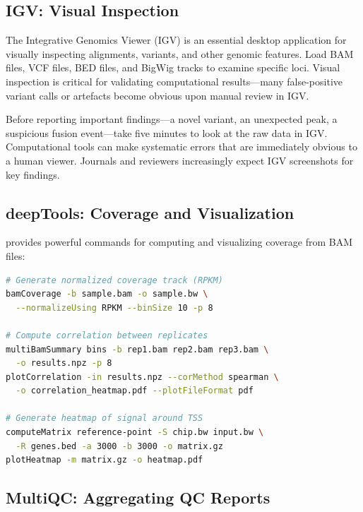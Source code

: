 \subsection{IGV: Visual Inspection}
\label{subsec:bioinf:igv}

The Integrative Genomics Viewer (IGV) is an essential desktop application for visually inspecting alignments, variants, and other genomic features. Load BAM files, VCF files, BED files, and BigWig tracks to examine specific loci. Visual inspection is critical for validating computational results---many false-positive variant calls or artefacts become obvious upon manual review in IGV.

\begin{tipbox}[title={Always Inspect Key Results in IGV}]
Before reporting important findings---a novel variant, an unexpected peak, a suspicious fusion event---take five minutes to look at the raw data in IGV. Computational tools can make systematic errors that are immediately obvious to a human viewer. Journals and reviewers increasingly expect IGV screenshots for key findings.
\end{tipbox}

\subsection{deepTools: Coverage and Visualization}
\label{subsec:bioinf:deeptools}

 provides powerful commands for computing and visualizing coverage from BAM files:

\begin{lstlisting}[language=bash,caption={deepTools for coverage analysis and visualization.},label=lst:deeptools]
# Generate normalized coverage track (RPKM)
bamCoverage -b sample.bam -o sample.bw \
  --normalizeUsing RPKM --binSize 10 -p 8

# Compute correlation between replicates
multiBamSummary bins -b rep1.bam rep2.bam rep3.bam \
  -o results.npz -p 8
plotCorrelation -in results.npz --corMethod spearman \
  -o correlation_heatmap.pdf --plotFileFormat pdf

# Generate heatmap of signal around TSS
computeMatrix reference-point -S chip.bw input.bw \
  -R genes.bed -a 3000 -b 3000 -o matrix.gz
plotHeatmap -m matrix.gz -o heatmap.pdf
\end{lstlisting}

\subsection{MultiQC: Aggregating QC Reports}
\label{subsec:bioinf:multiqc}


